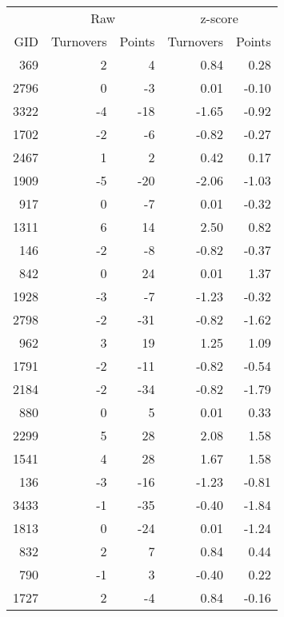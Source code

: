 \documentclass{exam}
\begin{document}
  \begin{table}[H]
    \centering
    \begin{tabular}{rrrrr}
      \toprule
           & \multicolumn{2}{c}{Raw} & \multicolumn{2}{c}{z-score } \\
      \cmidrule(r){2-3} \cmidrule(r){4-5} 
      GID  & Turnovers & Points & Turnovers & Points\\
      \midrule
      369  & 2         & 4      & 0.84      & 0.28 \\
      2796 & 0         & -3     & 0.01      & -0.10 \\
      3322 & -4        & -18    & -1.65     & -0.92 \\
      1702 & -2        & -6     & -0.82     & -0.27 \\
      2467 & 1         & 2      & 0.42      & 0.17 \\
      1909 & -5        & -20    & -2.06     & -1.03 \\
      917  & 0         & -7     & 0.01      & -0.32 \\
      1311 & 6         & 14     & 2.50      & 0.82 \\
      146  & -2        & -8     & -0.82     & -0.37 \\
      842  & 0         & 24     & 0.01      & 1.37 \\
      1928 & -3        & -7     & -1.23     & -0.32 \\
      2798 & -2        & -31    & -0.82     & -1.62 \\
      962  & 3         & 19     & 1.25      & 1.09 \\
      1791 & -2        & -11    & -0.82     & -0.54 \\
      2184 & -2        & -34    & -0.82     & -1.79 \\
      880  & 0         & 5      & 0.01      & 0.33 \\
      2299 & 5         & 28     & 2.08      & 1.58 \\
      1541 & 4         & 28     & 1.67      & 1.58 \\
      136  & -3        & -16    & -1.23     & -0.81 \\
      3433 & -1        & -35    & -0.40     & -1.84 \\
      1813 & 0         & -24    & 0.01      & -1.24 \\
      832  & 2         & 7      & 0.84      & 0.44 \\
      790  & -1        & 3      & -0.40     & 0.22 \\
      1727 & 2         & -4     & 0.84      & -0.16 \\

\end{tabular}
\end{table}
\end{document}
